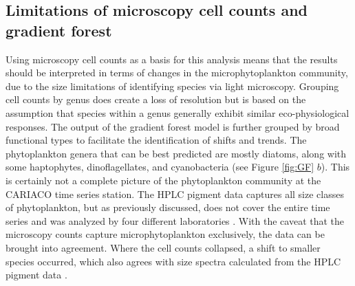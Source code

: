 \documentclass[draft]{agujournal2019}
\begin{document}
\subsection{Limitations of microscopy cell counts and gradient forest}

Using microscopy cell counts as a basis for this analysis means that the results should be interpreted in terms of changes in the microphytoplankton community, due to the size limitations of identifying species via light microscopy. Grouping cell counts by genus does create a loss of resolution but is based on the assumption that species within a genus generally exhibit similar eco-physiological responses. The output of the gradient forest model is further grouped by broad functional types to facilitate the identification of shifts and trends. The phytoplankton genera that can be best predicted are mostly diatoms, along with some haptophytes, dinoflagellates, and cyanobacteria (see Figure \ref{fig:GF} $b$). This is certainly not a complete picture of the phytoplankton community at the CARIACO time series station. The HPLC pigment data captures all size classes of phytoplankton, but as previously discussed, does not cover the entire time series and was analyzed by four different laboratories \cite{pinckney_phytoplankton_2015}. With the caveat that the microscopy counts capture microphytoplankton exclusively, the data can be brought into agreement. Where the cell counts collapsed, a shift to smaller species occurred, which also agrees with size spectra calculated from the HPLC pigment data \cite{lorenzoni_characterization_2015}.
\end{document}
